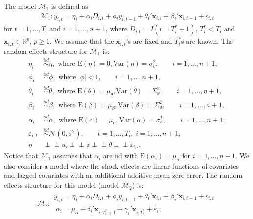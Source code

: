 \documentclass[11pt]{article}
\newcommand{\R}{\mathbb{R}}
\newcommand{\x}{\textbf{x}}
\def\mbf#1{\mathbf{#1}} %
\newcommand{\simiid}{\stackrel{iid}{\sim}} %
\def\where{\text{ where }} %
\newcommand{\indep}{\perp \!\!\! \perp } %
\def\t#1{\tilde{#1}} %
\def\normal#1#2{\mathcal{N}(#1,#2)} %
\def\mc#1{\mathcal{#1}} %
\def\E#1{\mathrm{E}(#1)} %
\def\var#1{\mathrm{Var}(#1)} %
\theoremstyle{definition}
\begin{document}
The model $\mc{M}_1$ is defined as
\begin{align}
\mc{M}_1 \colon y_{i,t} =\eta_i +\alpha_i D_{i,t} + \phi_i y_{i, t-1} + \theta_i'\mbf{x}_{i,t}+ \beta_i'\mbf{x}_{i, t-1} + \varepsilon_{i,t}\label{equation1}
\end{align}
for $t = 1,\ldots,T_i$ and $i = 1,\ldots, n+1$, where $D_{i,t} = I(t = T_i^* + 1)$, 
$T_i^* < T_i$ and $\x_{i,t} \in \R^{p}$, $p \geq 1$.  We assume that the 
$\mbf{x}_{i,t}$'s are fixed and $T_i^*$s are known. The random effects structure for $\mc{M}_1$ is:
\begin{align*}
  \eta_i &\simiid  \eta ,\where \E{\eta} = 0, \var{\eta} = \sigma^2_{\eta}, \qquad i = 1, \ldots, n+1,\\
  \phi_i &\simiid \phi, \where |\phi|<1, \qquad i = 1, \ldots, n+1, \\
   \theta_i &\simiid \theta, \where \E{\theta}=\mu_{\theta}, \var{\theta}=\Sigma_{\theta}^2, \qquad i = 1, \ldots, n + 1, \\
\beta_i &\simiid \beta, \where \E{\beta}=\mu_{\beta}, \var{\beta}=\Sigma_{\beta}^2, \qquad i = 1, \ldots, n+1,\\
\alpha_i &\simiid \alpha, \where \E{\alpha}=\mu_{\alpha}, \var{\alpha}=\sigma_{\alpha}^2, \qquad  i = 1, \ldots, n+1; \\
\varepsilon_{i,t} &\simiid \normal{0}{\sigma^2}, \qquad t=1, \ldots, T_i, \; i = 1, \ldots, n+1,\\
\eta &\indep  \alpha_i \indep \phi \indep \theta \indep \varepsilon_{i,t}.
\end{align*}
Notice that $\mc{M}_1$ assumes that $\alpha_i$ are iid with $\E{\alpha_i}=\mu_{\alpha}$ 
for $i = 1, \ldots, n+1$.  %
We also consider a model where the shock effects are linear functions of covariates and 
lagged covariates with an additional additive mean-zero error.
The random effects structure for this model (model $\mc{M}_2$) is:
\begin{align}
\mc{M}_2 \colon \begin{array}{l}
  y_{i,t} =\eta_i +\alpha_i D_{i,t} + \phi_i y_{i, t-1} + \theta_i'\mbf{x}_{i,t}+ \beta_i'\mbf{x}_{i, t-1} + \varepsilon_{i,t}\\[.2cm]
  \; \alpha_i = \mu_{\alpha}+\delta_{i}'\mbf{x}_{i, T_i^*+1}+\gamma_i'\mbf{x}_{i, T^*_i}+\t{\varepsilon}_{i},
\end{array}\label{model2}
\end{align}
\end{document}
